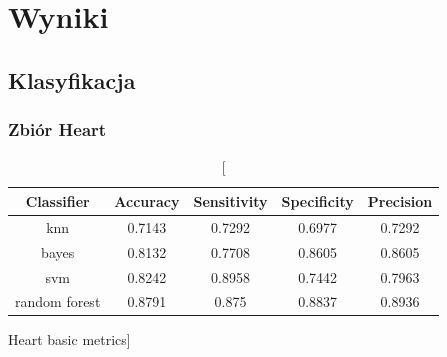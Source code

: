 \documentclass{classrep}
\begin{document}
    \section{Wyniki}
    \label{results} {

        \subsection{Klasyfikacja}
        \label{results:classification} {

            \subsubsection{Zbiór Heart} {

                \begin{table}[!htbp]
                    \centering
                    \begin{tabular}{|c|c|c|c|c|}
                        \hline
                        Classifier & Accuracy & Sensitivity & Specificity & Precision \\ \hline
                        knn & 0.7143 & 0.7292 & 0.6977 & 0.7292 \\ \hline
                        bayes & 0.8132 & 0.7708 & 0.8605 & 0.8605 \\ \hline
                        svm & 0.8242 & 0.8958 & 0.7442 & 0.7963 \\ \hline
                        random forest & 0.8791 & 0.875 & 0.8837 & 0.8936 \\ \hline
                    \end{tabular}
                    \caption
                    [Heart basic metrics]{}
                    \label{Heart_basic_metrics}
                \end{table}
                \FloatBarrier

}}}
\end{document}
